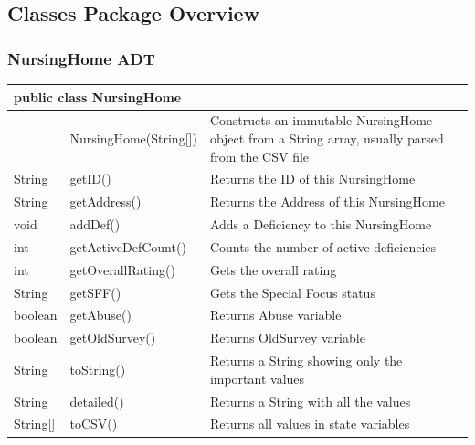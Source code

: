 \documentclass[12pt]{article}
\begin{document}
\subsection{Classes Package Overview}

\subsubsection{NursingHome ADT}
\begin{center}
\begin{tabular}{p{0.1\hsize}|p{0.25\hsize}|p{0.50\hsize}}
\multicolumn{3}{l}{\textbf{public class NursingHome}} \\
\hline
 & NursingHome(String[]) & Constructs an immutable NursingHome object from a String array, usually parsed from the CSV file\\
\hline
String 	& getID() & Returns the ID of this NursingHome\\
\hline
String 	& getAddress() & Returns the Address of this NursingHome\\
\hline
void 		& addDef() & Adds a Deficiency to this NursingHome \\
\hline
int 		& getActiveDefCount() & Counts the number of active deficiencies \\
\hline
int 		& getOverallRating() & Gets the overall rating \\
\hline
String	& getSFF() & Gets the Special Focus status \\
\hline
boolean 	& getAbuse() & Returns Abuse variable \\
\hline
boolean 	& getOldSurvey() & Returns OldSurvey variable\\
\hline
String 	& toString() & Returns a String showing only the important values\\
\hline
String 	& detailed() & Returns a String with all the values \\
\hline
String[] 	& toCSV() & Returns all values in state variables\\
\hline
\end{tabular}
\end{center}
\end{document}
